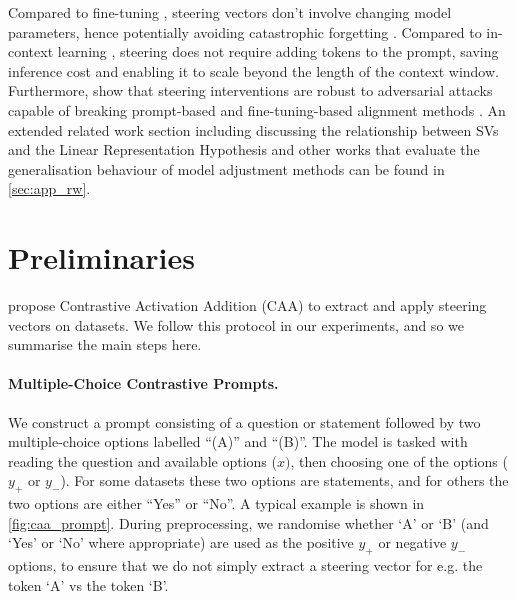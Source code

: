 \documentclass{article}
\begin{document}
Compared to fine-tuning \citep{zieglerFineTuningLanguageModels2020,rafailovDirectPreferenceOptimization2023a,mishraCrossTaskGeneralizationNatural2022}, steering vectors don't involve changing model parameters, hence potentially avoiding catastrophic forgetting \citep{bidermanLoRALearnsLess2024,luoEmpiricalStudyCatastrophic2024}. Compared to in-context learning \citep[ICL]{brownLanguageModelsAre2020,weiChainofThoughtPromptingElicits2023}, steering does not require adding tokens to the prompt, saving inference cost and enabling it to scale beyond the length of the context window. Furthermore, \citet{zouRepresentationEngineeringTopDown2023}  show that steering interventions are robust to adversarial attacks capable of breaking prompt-based and fine-tuning-based alignment methods \citep{perezDiscoveringLanguageModel2022a,weiJailbrokenHowDoes2023,jiangArtPromptASCIIArtbased2024}. An extended related work section including discussing the relationship between SVs and the Linear Representation Hypothesis \citep[LRH]{parkLinearRepresentationHypothesis2023} and other works that evaluate the generalisation behaviour of model adjustment methods can be found in \cref{sec:app_rw}.

\section{Preliminaries}\label{sec:prelims}
 \citet{rimskySteeringLlamaContrastive2023} propose Contrastive Activation Addition (CAA) to extract and apply steering vectors on datasets. We follow this protocol in our experiments, and so we summarise the main steps here.

\paragraph{Multiple-Choice Contrastive Prompts.} We construct a prompt consisting of a question or statement followed by two multiple-choice options labelled ``(A)'' and ``(B)''. The model is tasked with reading the question and available options ($x)$, then choosing one of the options ($y_+$ or $y_-$). For some datasets these two options are statements, and for others the two options are either ``Yes'' or ``No''. A typical example is shown in \cref{fig:caa_prompt}. During preprocessing, we randomise whether `A' or `B' (and `Yes' or `No' where appropriate) are used as the positive  $y_+$ or  negative  $y_-$ options, to ensure that we do not simply extract a steering vector for e.g. the token `A' vs the token `B'.
\end{document}
